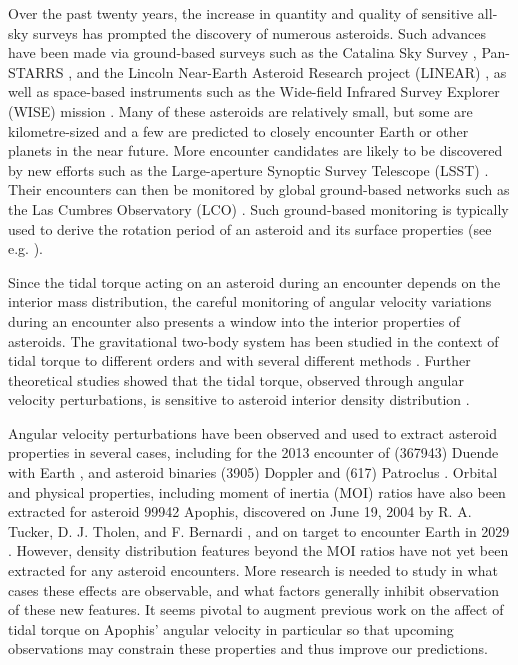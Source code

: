 \documentclass[fleqn,usenatbib]{mnras}
\begin{document}
Over the past twenty years, the increase in quantity and quality of sensitive all-sky surveys has prompted the discovery of numerous asteroids. Such advances have been made via ground-based surveys such as the Catalina Sky Survey \cite{larson1998catalina}, Pan-STARRS \cite{kaiser2002pan}, and the Lincoln Near-Earth Asteroid Research project (LINEAR) \cite{stokes2000lincoln}, as well as space-based instruments such as the Wide-field Infrared Survey Explorer (WISE) mission \cite{wright2010wide}. Many of these asteroids are relatively small, but some are kilometre-sized and a few are predicted to closely encounter Earth or other planets in the near future. More encounter candidates are likely to be discovered by new efforts such as the Large-aperture Synoptic Survey Telescope (LSST) \cite{tyson2002large}. Their encounters can then be monitored by global ground-based networks such as the Las Cumbres Observatory (LCO) \cite{brown2013cumbres}. Such ground-based monitoring is typically used to derive the rotation period of an asteroid and its surface properties (see e.g. \cite{10.1093/mnras/stab1252}).

Since the tidal torque acting on an asteroid during an encounter depends on the interior mass distribution, the careful monitoring of angular velocity variations during an encounter also presents a window into the interior properties of asteroids. The gravitational two-body system has been studied in the context of tidal torque to different orders and with several different methods \cite{paul88, SCHEERES2000106, ashenberg07, BOUE2009750, HouMar2017}. Further theoretical studies showed that the tidal torque, observed through angular velocity perturbations, is sensitive to asteroid interior density distribution \cite{Naidu_2015, Makarov2022ChaosOO, scheeres2004evolution}.

Angular velocity perturbations have been observed and used to extract asteroid properties in several cases, including for the 2013 encounter of (367943) Duende with Earth \cite{MOSKOVITZ2020113519, benson2020spin}, and asteroid binaries (3905) Doppler and (617) Patroclus \cite{DESCAMPS2020113726, BERTHIER2020113990}. Orbital and physical properties, including moment of inertia (MOI) ratios have also been extracted for asteroid 99942 Apophis, discovered on June 19, 2004 by R. A. Tucker, D. J. Tholen, and F. Bernardi \cite{giorgini2005recent, giorgini2008predicting, smalley20052004}, and on target to encounter Earth in 2029 \cite{yu2014numerical, hirabayashi2021finite, valvano2022apophis, Lee2022Apophis}. However, density distribution features beyond the MOI ratios have not yet been extracted for any asteroid encounters. More research is needed to study in what cases these effects are observable, and what factors generally inhibit observation of these new features. It seems pivotal to augment previous work on the affect of tidal torque on Apophis' angular velocity in particular \cite{souchay2014rotational, souchay2018changes} so that upcoming observations may constrain these properties and thus improve our predictions.
\end{document}
